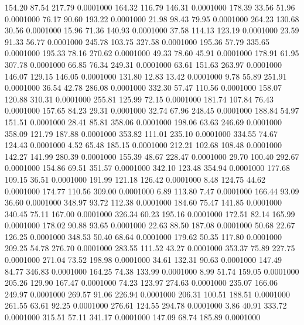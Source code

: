  154.20   87.54  217.79   0.0001000
 164.32  116.79  146.31   0.0001000
 178.39   33.56   51.96   0.0001000
  76.17   90.60  193.22   0.0001000
  21.98   98.43   79.95   0.0001000
 264.23  130.68   30.56   0.0001000
  15.96   71.36  140.93   0.0001000
  37.58  114.13  123.19   0.0001000
  23.59   91.33   56.77   0.0001000
 245.78  103.75  327.58   0.0001000
 195.36   57.79  335.65   0.0001000
 195.33   78.16  270.62   0.0001000
  49.33   78.60   45.91   0.0001000
 178.91   61.95  307.78   0.0001000
  66.85   76.34  249.31   0.0001000
  63.61  151.63  263.97   0.0001000
 146.07  129.15  146.05   0.0001000
 131.80   12.83   13.42   0.0001000
   9.78   55.89  251.91   0.0001000
  36.54   42.78  286.08   0.0001000
 332.30   57.47  110.56   0.0001000
 158.07  120.88  310.31   0.0001000
 255.81  125.99   72.15   0.0001000
 181.74  107.84   76.43   0.0001000
 157.65   84.23   29.31   0.0001000
  32.74   67.96  248.45   0.0001000
 188.84   54.97  151.51   0.0001000
  28.41   85.81  358.06   0.0001000
 198.06   63.63  246.69   0.0001000
 358.09  121.79  187.88   0.0001000
 353.82  111.01  235.10   0.0001000
 334.55   74.67  124.43   0.0001000
   4.52   65.48  185.15   0.0001000
 212.21  102.68  108.48   0.0001000
 142.27  141.99  280.39   0.0001000
 155.39   48.67  228.47   0.0001000
  29.70  100.40  292.67   0.0001000
 154.86   69.51  351.57   0.0001000
 342.10  123.48  354.94   0.0001000
 177.68  109.15   36.51   0.0001000
 191.99  121.18  126.42   0.0001000
   8.48  124.75   44.62   0.0001000
 174.77  110.56  309.00   0.0001000
   6.89  113.80    7.47   0.0001000
 166.44   93.09   36.60   0.0001000
 348.97   93.72  112.38   0.0001000
 184.60   75.47  141.85   0.0001000
 340.45   75.11  167.00   0.0001000
 326.34   60.23  195.16   0.0001000
 172.51   82.14  165.99   0.0001000
 178.02   90.88   93.65   0.0001000
  22.63   88.50  187.08   0.0001000
  50.68   22.67  126.25   0.0001000
 348.53   50.40   68.64   0.0001000
 179.62   50.35  117.80   0.0001000
 209.25   54.78  276.70   0.0001000
 283.55  111.52   43.27   0.0001000
 353.37   75.89  227.75   0.0001000
 271.04   73.52  198.98   0.0001000
  34.61  132.31   90.63   0.0001000
 147.49   84.77  346.83   0.0001000
 164.25   74.38  133.99   0.0001000
   8.99   51.74  159.05   0.0001000
 205.26  129.90  167.47   0.0001000
  74.23  123.97  274.63   0.0001000
 235.07  166.06  249.97   0.0001000
 269.57   91.06  226.94   0.0001000
 206.31  100.51  188.51   0.0001000
 261.55   63.61   92.25   0.0001000
 276.61  124.55  294.78   0.0001000
   3.86   40.91  333.72   0.0001000
 315.51   57.11  341.17   0.0001000
 147.09   68.74  185.89   0.0001000
